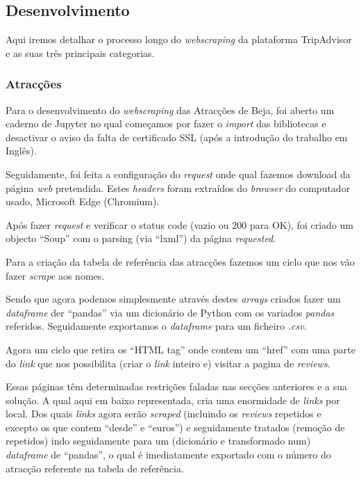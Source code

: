 \subsection{Desenvolvimento}

Aqui iremos detalhar o processo longo do \textit{webscraping} da plataforma TripAdvisor e as suas três principais categorias.

\subsubsection{Atracções}
Para o desenvolvimento do \textit{webscraping} das Atracções de Beja, foi aberto um caderno de Jupyter no qual começamos por fazer o \textit{import} das bibliotecas e desactivar o aviso da falta de certificado SSL (após a introdução do trabalho em Inglês).

Seguidamente, foi feita a configuração do \textit{request} onde qual fazemos download da página \textit{web} pretendida. Estes \textit{headers} foram extraídos do \textit{browser} do computador usado, Microsoft Edge (Chromium).

Após fazer \textit{request} e verificar o status code (vazio ou 200 para OK), foi criado um objecto ``Soup'' com o parsing (via ``lxml'') da página \textit{requested}.

Para a criação da tabela de referência das atracções fazemos um ciclo que nos vão fazer \textit{scrape} aos nomes.

Sendo que agora podemos simplesmente através destes \textit{arrays} criados fazer um \textit{dataframe} der ``pandas'' via um dicionário de Python com os variados \textit{pandas} referidos. Seguidamente exportamos o \textit{dataframe} para um ficheiro \textit{.csv}.

Agora um ciclo que retira os ``HTML tag'' onde  contem um ``href'' com uma parte do \textit{link} que nos possibilita (criar o \textit{link} inteiro e) visitar a pagina de \textit{reviews}.

Essas páginas têm determinadas restrições faladas nas secções anteriores e a sua solução. A qual aqui em baixo representada, cria uma enormidade de \textit{links} por local.
Dos quais \textit{links} agora serão \textit{scraped} (incluindo os \textit{reviews} repetidos e excepto os que contem ``desde'' e ``euros'') e seguidamente tratados (remoção de repetidos) indo seguidamente para um (dicionário e transformado num) \textit{dataframe} de ``pandas'', o qual é imediatamente exportado com o número do atracção referente na tabela de referência.
